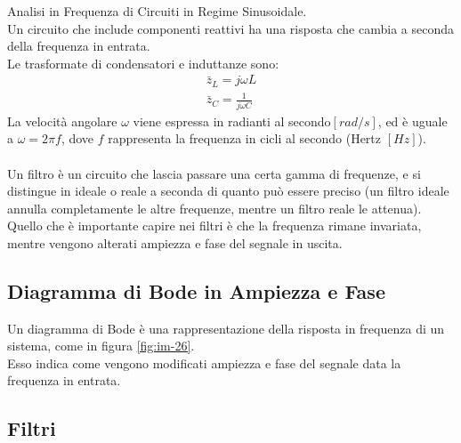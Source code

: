 \documentclass[../main.tex]{subfiles}
\begin{document}
	Analisi in Frequenza di Circuiti in Regime Sinusoidale.\\
	Un circuito che include componenti reattivi ha una risposta che cambia a seconda della frequenza in entrata.\\
	Le trasformate di condensatori e induttanze sono:
	\begin{gather}
		\bar z_L = j\omega L \\
		\bar z_C = \frac{1}{j\omega C}
	\end{gather}
	La velocità angolare $\omega$ viene espressa in radianti al secondo$\left[ rad/s \right]$, ed è uguale a $\omega = 2\pi f$, dove $f$ rappresenta la frequenza in cicli al secondo (Hertz $\left[ Hz \right]$).\\\\
	Un filtro è un circuito che lascia passare una certa gamma di frequenze, e si distingue in ideale o reale a seconda di quanto può essere preciso (un filtro ideale annulla completamente le altre frequenze, mentre un filtro reale le attenua).\\
	Quello che è importante capire nei filtri è che la frequenza rimane invariata, mentre vengono alterati ampiezza e fase del segnale in uscita.
	\subsection{Diagramma di Bode in Ampiezza e Fase}
	Un diagramma di Bode è una rappresentazione della risposta in frequenza di un sistema, come in figura \ref{fig:im-26}. \\
	Esso indica come vengono modificati ampiezza e fase del segnale data la frequenza in entrata.
	\subsection{Filtri}
\end{document}
